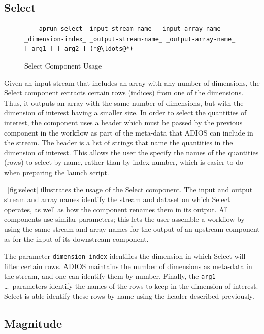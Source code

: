 \subsection{Select}

\begin{figure}
  \begin{lstlisting}
    aprun select _input-stream-name_ _input-array-name_ _dimension-index_ _output-stream-name_ _output-array-name_ [_arg1_] [_arg2_] (*@\ldots@*)
  \end{lstlisting}
  \caption{Select Component Usage}
  \label{fig:select}
\end{figure}

Given an input stream that includes an array with
any number of dimensions,
the Select component extracts certain rows (indices) from one of
the dimensions.
Thus, it outputs an array
with the same number of dimensions,
but with the dimension of interest having a
smaller size. In order to select the quantities of
interest, the component uses a header which
must be passed by the previous component in the
workflow as part of the meta-data that ADIOS
can include in the stream.
The header is a list of strings that
name the quantities in the
dimension of interest.
This allows the user the specify
the names of the quantities (rows)
to select by name, rather than by index number,
which is easier to do when preparing the launch script.

~\autoref{fig:select} illustrates the usage
of the Select component. 
The input and output stream and array names
identify the stream and dataset on
which Select operates, as well as how
the component renames them in its output.
All components use similar parameters; this lets
the user assemble a workflow by
using the same stream and array names
for the output of an upstream component
as for the input of its downstream component.

The parameter \texttt{dimension-index} identifies
the dimension in which Select will filter
certain rows. ADIOS maintains the number of dimensions
as meta-data in the stream, and one can identify them
by number. Finally, the \texttt{arg1} \ldots \ parameters 
identify the names of the rows to keep in the dimension
of interest. Select is able identify these rows
by name using the header described previously.

\subsection{Magnitude}

